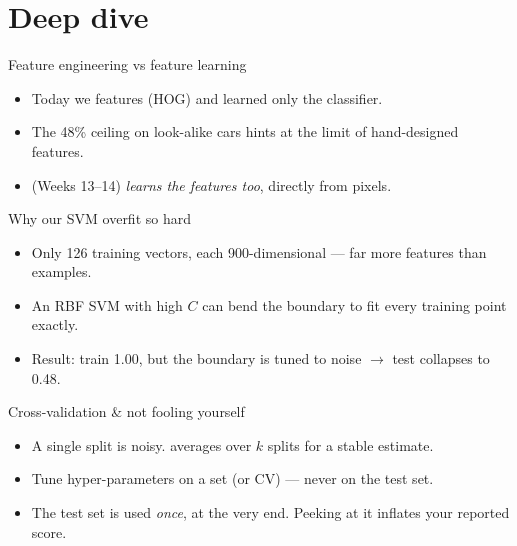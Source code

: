\documentclass[10pt,aspectratio=169]{beamer}
\begin{document}
\section{Deep dive}

\begin{frame}{Feature engineering vs feature learning}
  \begin{itemize}
    \item Today we  features (HOG) and learned only the classifier.
    \item The 48\% ceiling on look-alike cars hints at the limit of hand-designed features.
    \item {} (Weeks 13--14) \emph{learns the features too}, directly from pixels.
  \end{itemize}
\end{frame}

\begin{frame}{Why our SVM overfit so hard}
  \begin{itemize}
    \item Only 126 training vectors, each 900-dimensional — far more features than examples.
    \item An RBF SVM with high $C$ can bend the boundary to fit every training point exactly.
    \item Result: train 1.00, but the boundary is tuned to noise $\rightarrow$ test collapses to 0.48.
  \end{itemize}
\end{frame}

\begin{frame}{Cross-validation \& not fooling yourself}
  \begin{itemize}
    \item A single split is noisy.  averages over $k$ splits for a stable estimate.
    \item Tune hyper-parameters on a  set (or CV) — never on the test set.
    \item The test set is used \emph{once}, at the very end. Peeking at it inflates your reported score.
  \end{itemize}
\end{frame}
\end{document}
